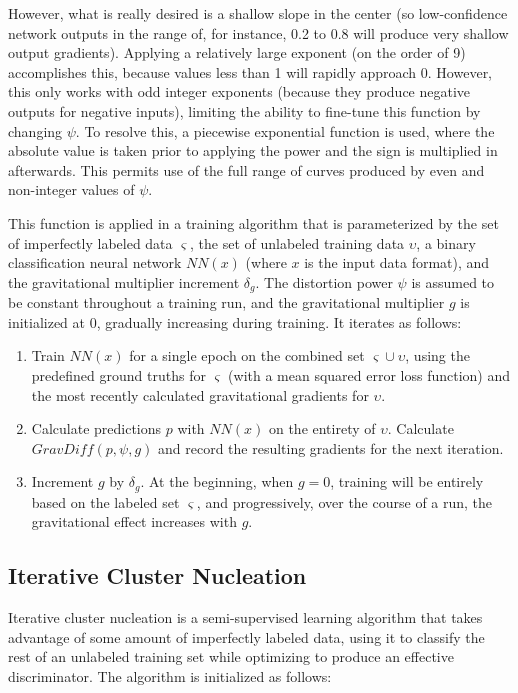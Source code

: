 \documentclass[10pt]{article}
\begin{document}
However, what is really desired is a shallow slope in the center (so low-confidence network outputs in the range of, for instance, 0.2 to 0.8 will produce very shallow output gradients). Applying a relatively large exponent (on the order of 9) accomplishes this, because values less than 1 will rapidly approach 0. However, this only works with odd integer exponents (because they produce negative outputs for negative inputs), limiting the ability to fine-tune this function by changing $\psi$. To resolve this, a piecewise exponential function is used, where the absolute value is taken prior to applying the power and the sign is multiplied in afterwards. This permits use of the full range of curves produced by even and non-integer values of $\psi$.

This function is applied in a training algorithm that is parameterized by the set of imperfectly labeled data $\varsigma$, the set of unlabeled training data $\upsilon$, a binary classification neural network $NN(x)$ (where $x$ is the input data format), and the gravitational multiplier increment $\delta_g$. The distortion power $\psi$ is assumed to be constant throughout a training run, and the gravitational multiplier $g$ is initialized at 0, gradually increasing during training. It iterates as follows:

\begin{enumerate}
    \item Train $NN(x)$ for a single epoch on the combined set $\varsigma \cup \upsilon$, using the predefined ground truths for $\varsigma$ (with a mean squared error loss function) and the most recently calculated gravitational gradients for $\upsilon$.
    \item Calculate predictions $p$ with $NN(x)$ on the entirety of $\upsilon$. Calculate $GravDiff(p, \psi, g)$ and record the resulting gradients for the next iteration.
    \item Increment $g$ by $\delta_{g}$. At the beginning, when $g = 0$, training will be entirely based on the labeled set $\varsigma$, and progressively, over the course of a run, the gravitational effect increases with $g$.
\end{enumerate}

\subsection{Iterative Cluster Nucleation}

Iterative cluster nucleation is a semi-supervised learning algorithm that takes advantage of some amount of imperfectly labeled data, using it to classify the rest of an unlabeled training set while optimizing to produce an effective discriminator. The algorithm is initialized as follows:
\end{document}
